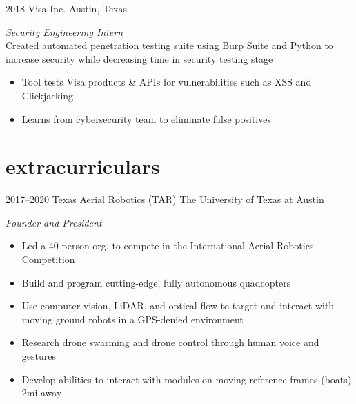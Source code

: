\documentclass[]{friggeri-cv} %
\begin{document}
\begin{entrylist}
	
	\entry
	{2018}
	{Visa Inc.}
	{Austin, Texas}
	{\emph{Security Engineering Intern} \\
			Created automated penetration testing suite using Burp Suite and Python to increase security while decreasing time in security testing stage
			\begin{itemize}
				\item Tool tests Visa products \& APIs for vulnerabilities such as XSS and Clickjacking
				\item Learns from cybersecurity team to eliminate false positives
			\end{itemize}
	}

\end{entrylist}

\vspace{-5pt}
\section{extracurriculars}
\vspace{-10pt}

\begin{entrylist}
	
	\entry
	{2017--2020}
	{Texas Aerial Robotics (TAR)}
	{The University of Texas at Austin}
	{
		\emph{Founder and President}
		\begin{itemize}
			\item Led a 40 person org. to compete in the International Aerial Robotics Competition
			\item Build and program cutting-edge, fully autonomous quadcopters
			\item Use computer vision, LiDAR, and optical flow to target and interact with moving ground robots in a GPS-denied environment
			\item Research drone swarming and drone control through human voice and gestures
			\item Develop abilities to interact with modules on moving reference frames (boats) 2mi away
		\end{itemize}
	}
	
\end{entrylist}

\vspace{-25pt}
\end{document}
